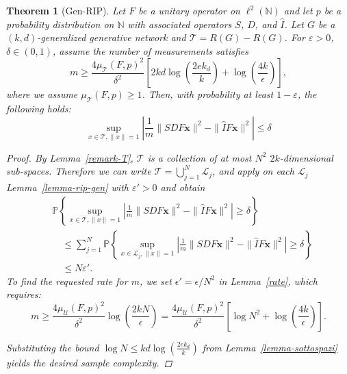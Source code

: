 \documentclass[a4paper,oneside]{amsart}
\newtheorem{theorem}{Theorem}[section]
\begin{document}
\begin{theorem}[Gen-RIP]\label{gen-rip}
    Let $F$ be a unitary operator on $\ell^2(\mathbb{N})$ and let $p$ be a probability distribution on $\mathbb{N}$ with associated operators $S$, $D$, and $\hat{I}$. Let $G$ be a $(k, d)$-generalized generative network and $\mathcal{T}= R(G) - R(G)$. For $\varepsilon>0$, $\delta \in (0,1)$, assume the number of measurements satisfies
  $$m \ge \frac{4\mu_{\mathcal{T}}(F,p)^2}{\delta^2} \left[ 2kd \log\left(\frac{2e k_d}{k}\right) + \log\left(\frac{4k}{\epsilon}\right) \right],$$
    where we assume $\mu_{\mathcal{T}}(F,p)\geq 1$.
    Then, with probability at least $1-\varepsilon$, the following holds:
    \begin{equation*}
        \sup_{x\in \mathcal{T}, \|x\| =1 } \left| \frac 1 m\|S D F \boldsymbol{x}\|^2-\| \hat{I} F \boldsymbol{x}\|^2\right| \le \delta
    \end{equation*}
\begin{proof}
    By Lemma~\ref{remark-T}, $\mathcal T$ is a collection of at most $N^2$ $2k$-dimensional sub-spaces. Therefore we can write $\mathcal{T} = \bigcup_{j=1}^N \mathcal{L}_j$, and apply on each $\mathcal{L}_j$ Lemma~\ref{lemma-rip-gen} with $\varepsilon'>0$ and obtain
    \[
    \begin{aligned}
        & \mathbb{P}\left\{\sup _{x \in \mathcal{T}, \|x\|=1}\left|\frac 1 m\|S D F \boldsymbol{x}\|^2-\| \hat{I} F \boldsymbol{x}\|^2\right| \geq \delta\right\} \\
        & \quad \leq \sum_{j=1}^N \mathbb{P}\left\{\sup _{x \in \mathcal{L}_j ,\|x\|=1}\left| \frac 1 m\|S D F \boldsymbol{x}\|^2-\| \hat{I} F \boldsymbol{x}\|^2\right|\geq \delta\right\} \\
        & \quad \leq N \varepsilon' .
    \end{aligned}
    \]
    To find the requested rate for $m$,  we set $\epsilon' = \epsilon / N^2$ in Lemma~\ref{rate}, which requires:$$m \ge \frac{4\mu_{\mathcal{U}}(F,p)^2}{\delta^2} \log\left(\frac{2k N}{\epsilon}\right) = \frac{4\mu_{\mathcal{U}}(F,p)^2}{\delta^2} \left[ \log N^2 + \log\left(\frac{4k}{\epsilon}\right) \right].$$
    
    Substituting the bound $\log N \le kd \log\left(\frac{2e k_d}{k}\right)$ from Lemma~\ref{lemma-sottospazi} yields the desired sample complexity.    
\end{proof}
\end{theorem}
\end{document}
